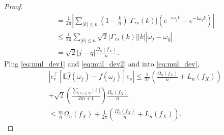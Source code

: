 \begin{proof}
\begin{equation}
\begin{aligned}
&= \frac{1}{2\pi}\left|\sum_{|k|\le n} \left(1-\frac{k}{n}\right) |\Gamma_{rs}(k)| (e^{-i\omega_jk} - e^{-i\omega_qk})\right|\\
&\le \frac{1}{2\pi} \sum_{|k|\le n} \sqrt{2} |\Gamma_{rs}(k)| |k||\omega_j - \omega_q| \\
&= \sqrt{2} |j-q| \frac{\Omega_n(f_X)}{n}. 
\end{aligned}
\end{equation}
Plug \eqref{eq:mul_dev1} and \eqref{eq:mul_dev2} and into \eqref{eq:mul_dev},  
\begin{equation}
\begin{aligned}
&\left|e_r^\top \left[\mathbb{E}\hat{f}(\omega_j) - f(\omega_j)\right]e_s\right| \le \frac{1}{2\pi}\left(\frac{\Omega_n(f_X)}{n} + L_n(f_X)\right)\\
&+\sqrt{2} \left(\frac{\sum_{|\ell|\le m} |\ell|}{2m+1}\right)\frac{\Omega_n(f_X)}{n}\\
&\le \frac{m}{n}\Omega_n(f_X) + \frac{1}{2\pi}\left(\frac{\Omega_n(f_X)}{n}+L_n(f_X)\right).
\end{aligned}
\end{equation}
\end{proof}

